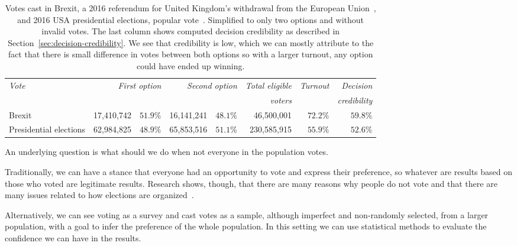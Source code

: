 \documentclass[format=acmsmall, review=true, screen=true, anonymous=true]{acmart}
\begin{document}
\begin{table}
  \centering
  \begin{small}
  \begin{tabular}{l r r r r r r r}
    {\small\textit{Vote}} & \multicolumn{2}{r}{\small \textit{First option}} & \multicolumn{2}{r}{\small \textit{Second option}} & {\small \textit{Total eligible}} & {\small \textit{Turnout}} & {\small \textit{Decision}} \\
    & & & & & {\small \textit{voters}} & & {\small \textit{credibility}} \\
    \midrule
    Brexit & 17,410,742 & $51.9\%$ & 16,141,241 & $48.1\%$ & 46,500,001 & $72.2\%$ & $59.8\%$ \\
    Presidential elections & 62,984,825 & $48.9\%$ & 65,853,516 & $51.1\%$ & 230,585,915 & $55.9\%$ & $52.6\%$ \\
  \end{tabular}
  \end{small}
  \bigskip\caption{Votes cast in Brexit, a 2016 referendum for United Kingdom's withdrawal from the European Union~\protect\cite{brexitresults},
  and 2016 USA presidential elections, popular vote~\protect\cite{usaresults1,usaresults2}. Simplified to only two options and without
  invalid votes. The last column shows computed decision credibility as described in Section~\ref{sec:decision-credibility}. We see that
  credibility is low, which we can mostly attribute to the fact that there is small difference in votes between both options so with a larger turnout, any option could have ended up winning.}\label{tab:example}
  \vspace{-0.3cm}
\end{table}

An underlying question is what should we do when not everyone in the population votes.

Traditionally, we can have a stance that everyone had an opportunity to vote and express
their preference, so whatever are results based on those who voted are legitimate results.
Research shows, though, that there are many reasons why people do not vote and that there
are many issues related to how elections are organized~\cite{CANCELA2016264, GIMPEL2003471}.

Alternatively, we can see voting as a survey and cast votes as a sample, although imperfect
and non-randomly selected, from a larger population, with a goal to infer the preference
of the whole population. In this setting we can use statistical methods to evaluate the
confidence we can have in the results.
\end{document}
